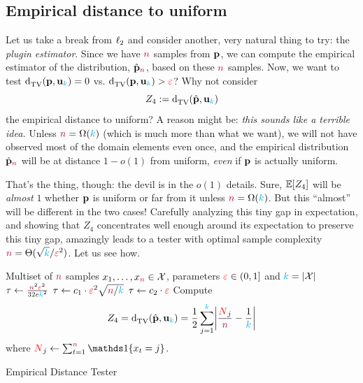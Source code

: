
\subsection{Empirical distance to uniform}
  \label{sec:uniformity:empirical}
 Let us take a break from $\lp[2]$ and consider another, very natural thing to try: the \emph{plugin estimator}. Since we have $\ns$ samples from $\p$, we can compute the empirical estimator of the distribution, $\hat{\p}_\ns$, based on these $\ns$ samples. Now, we want to test $\totalvardist{\p}{\uniform_\ab}=0$ vs. $\totalvardist{\p}{\uniform_\ab}>\dst$? Why not consider 
\begin{equation}
    Z_4 \eqdef \totalvardist{\hat{\p}}{\uniform_\ab}
\end{equation}
the empirical distance to uniform? A reason might be: \emph{this sounds like a terrible idea.} Unless $\ns = \Omega(\ab)$ (which is much more than what we want), we will not have observed most of the domain elements even once, and the empirical distribution $\hat{\p}_\ns$ will be at distance $1-o(1)$ from uniform, \emph{even} if $\p$ is actually uniform. 

That's the thing, though: the devil is in the $o(1)$ details. Sure, $\expect{Z_4}$ will be \emph{almost} $1$ whether $\p$ is uniform or far from it unless $\ns = \Omega(\ab)$. But this ``almost'' will be different in the two cases! Carefully analyzing this tiny gap in expectation, and showing that $Z_4$ concentrates well enough around its expectation to preserve this tiny gap, amazingly leads to a tester with optimal sample complexity $\ns = \Theta(\sqrt{\ab}/\dst^2)$. Let us see how.

\begin{algorithm}[ht!]
  \begin{algorithmic}[1]
    \Require Multiset of $\ns$ samples $x_1,\dots,x_\ns \in \domain$, parameters $\dst\in(0,1]$ and $\ab = \abs{\domain}$
    \If{ $\ns \leq \ab$ }
        \State $\tau \gets \frac{\ns^2\dst^2}{32e\ab^2}$
        \State $\tau \gets c_1\cdot \dst^2\sqrt{\ns/\ab}$ 
    \Else
        \State $\tau \gets c_2\cdot\dst$ 
    \EndIf
    \State Compute 
    \[
        Z_4 = \totalvardist{\hat{\p}}{\uniform_\ab} = \frac{1}{2} \sum_{j=1}^\ab \abs{\frac{\occur_j}{\ns} - \frac{1}{\ab} }
    \] where $\occur_j \gets \sum_{t=1}^\ns\indic{x_t=j}$.
     \Return \reject {}
    \Else\ 
      \Return \accept {}
    \EndIf
  \end{algorithmic}
  \caption{\label{algo:empirical:plugin}\sc Empirical Distance Tester}
\end{algorithm}

